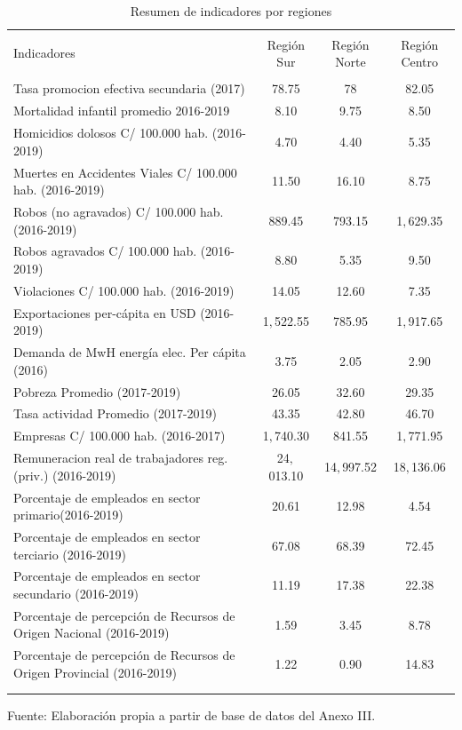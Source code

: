 \documentclass[12pt,a4paper]{article}
\begin{document}
\begin{table}[!htbp] 
\center
\scriptsize
\raggedleft
  \caption{\\Resumen de indicadores por regiones} 
  \label{cuadro:indicadores} 
\begin{tabular}{@{\extracolsep{5pt}} lccc} 
\\[-1.8ex]\hline 
\hline \\[-1.8ex] 
 Indicadores & Región Sur & Región Norte & Región Centro \\ 
\hline \\[-1.8ex] 
Tasa promocion efectiva secundaria (2017) & 78.75 & 78 & 82.05 \\ 
Mortalidad infantil promedio 2016-2019 & 8.10 & 9.75 & 8.50 \\ 
Homicidios dolosos C/ 100.000 hab. (2016-2019) & 4.70 & 4.40 & 5.35 \\ 
Muertes en Accidentes Viales C/ 100.000  hab.  (2016-2019) & 11.50 & 16.10 & 8.75 \\ 
Robos (no agravados) C/ 100.000 hab. (2016-2019) & 889.45 & 793.15 & 1$,$629.35 \\ 
Robos agravados C/ 100.000 hab. (2016-2019) & 8.80 & 5.35 & 9.50 \\ 
Violaciones  C/ 100.000 hab. (2016-2019) & 14.05 & 12.60 & 7.35 \\ 
Exportaciones per-cápita en USD (2016-2019) & 1$,$522.55 & 785.95 & 1$,$917.65 \\ 
Demanda de MwH energía elec. Per cápita (2016) & 3.75 & 2.05 & 2.90 \\ 
Pobreza Promedio (2017-2019) & 26.05 & 32.60 & 29.35 \\ 
Tasa actividad Promedio (2017-2019) & 43.35 & 42.80 & 46.70 \\ 
Empresas  C/ 100.000 hab. (2016-2017) & 1$,$740.30 & 841.55 & 1$,$771.95 \\ 
Remuneracion  real de trabajadores reg. (priv.) (2016-2019) & 24$,$013.10 & 14$,$997.52 & 18$,$136.06 \\ 
Porcentaje de empleados en sector primario(2016-2019) & 20.61 & 12.98 & 4.54 \\ 
Porcentaje de empleados en sector terciario (2016-2019) & 67.08 & 68.39 & 72.45 \\ 
Porcentaje de empleados en sector secundario (2016-2019) & 11.19 & 17.38 & 22.38 \\ 
Porcentaje de percepción de Recursos de Origen Nacional (2016-2019) & 1.59 & 3.45 & 8.78 \\ 
Porcentaje de percepción de Recursos de Origen Provincial  (2016-2019) & 1.22 & 0.90 & 14.83 \\ 
\\ 
\hline \\[-1.8ex] 

\end{tabular} 
\begin{flushleft}
\begin{scriptsize}
Fuente: Elaboración propia a partir de base de datos del Anexo III.\\
\end{scriptsize}
\end{flushleft}
\end{table} 
\end{document}
